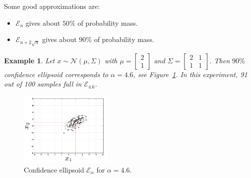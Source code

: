 \documentclass{article}[12pt]
\def\Eps{\mathcal{E}}
\def\1{\mathbf{1}}
\newtheorem{example}{Example}
\begin{document}
Some good approximations are:
\begin{itemize}[noitemsep,topsep=0pt]
	\item $\Eps_n$ gives about $50\%$ of probability mass.
	\item $\Eps_{n+2\sqrt{n}}$ gives about $90\%$ of probability mass.
\end{itemize}

\begin{example}
	Let $x\sim\mathcal{N}(\mu,\Sigma)$ with $\mu=\begin{bmatrix}
	2\\1 
	\end{bmatrix}$ and $\Sigma=\begin{bmatrix}
	2 &1\\ 1 &1
	\end{bmatrix}$. Then $90\%$ confidence ellipsoid corresponds to $\alpha=4.6$, see Figure~\ref{fig:ex_el}. In this experiment, 91 out of 100 samples fall in $\Eps_{4.6}$.
\end{example}
\begin{figure}[h]
	\centering
	\includegraphics[width=0.4\textwidth]{figures/ex_el.png}
	\caption{\small Confidence ellipsoid $\Eps_\alpha$ for $\alpha=4.6$.}
	\vspace{-10pt}
	\label{fig:ex_el}
\end{figure}
\end{document}
